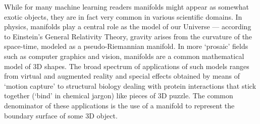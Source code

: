 While for many machine learning readers manifolds might appear as somewhat exotic objects, they are in fact very common in various scientific domains. In physics, manifolds play a central role as the model of our Universe --- according to Einstein's General Relativity Theory, gravity arises from the curvature of the space-time, modeled as a pseudo-Riemannian manifold.  
%
In more `prosaic' fields such as computer graphics and vision, manifolds are a common mathematical model of 3D shapes.  %
%
The broad spectrum of applications of such models ranges from virtual and augmented reality and 
special effects obtained by means of `motion capture' to structural biology dealing with protein interactions that stick together (`bind' in chemical jargon) like pieces of 3D puzzle. 
%
The common denominator of these applications is the use of a manifold to represent the boundary surface of some 3D object. 


